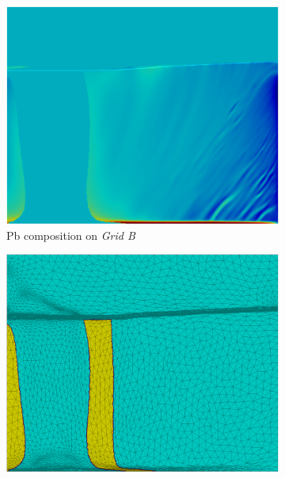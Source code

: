 \begin{figure}[H]
\begin{subfigure}[t]{0.15\textwidth}
  \end{subfigure}
  \begin{subfigure}[t]{0.4\textwidth}
    \centering
  \includegraphics[width=\textwidth]{Chapter5/Graphics/2d/1700s_compobis.png}
  \caption{Pb composition on \emph{Grid B}}
    \label{fig:1700s_compobis}
  \end{subfigure}
   \vspace{5mm}
  \begin{subfigure}[t]{0.4\textwidth}
    \centering
  \includegraphics[width=\textwidth]{Chapter5/Graphics/2d/1700s_unmask.png}

\end{subfigure}
\end{figure}
